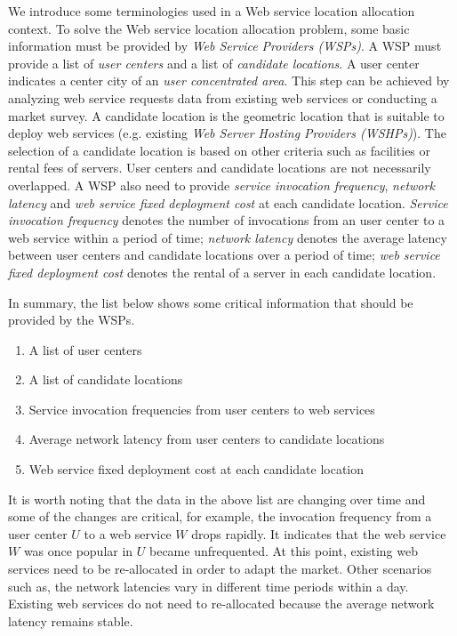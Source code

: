 We introduce some terminologies used in a Web service location allocation context.
To solve the Web service location allocation problem, 
some basic information must be provided by \emph{Web Service Providers (WSPs)}. A WSP must provide a list 
of \emph{user centers} and a list of \emph{candidate locations}. A user center indicates a center city of an \emph{user concentrated area}. 
This step can be achieved by analyzing web service requests data from existing web services or conducting a market survey. 
A candidate location is the geometric location that is suitable to 
deploy web services (e.g. existing \emph{Web Server Hosting Providers (WSHPs)}). 
The selection of a candidate location is based on other criteria such as facilities or rental fees of servers. 
User centers and candidate locations are not necessarily overlapped.
A WSP also need to provide \emph{service invocation frequency}, \emph{network latency} and \emph{web service fixed deployment cost} at each candidate location. 
\emph{Service invocation frequency} denotes the number of invocations from an user center
to a web service within a period of time; \emph{network latency} denotes the average latency between user centers and candidate locations over a period of time;
\emph{web service fixed deployment cost} denotes the rental of a server in each candidate location.

In summary, the list below shows some critical information that should be provided by the WSPs.

\begin{enumerate}
	\itemsep0em
	\item A list of user centers
	\item A list of candidate locations
	\item Service invocation frequencies from user centers to web services
	\item Average network latency from user centers to candidate locations
	\item Web service fixed deployment cost at each candidate location
\end{enumerate}

It is worth noting that the data in the above list are changing over time and some of the changes are critical,
for example, the invocation frequency from a user center $U$ to a web service $W$ drops rapidly. 
It indicates that the web service $W$ was once popular in $U$ became unfrequented.
At this point, existing web services need to be re-allocated in order to adapt the market. Other scenarios such as,
the network latencies vary in different time periods within a day. Existing web services do not need to re-allocated because 
the average network latency remains stable.


